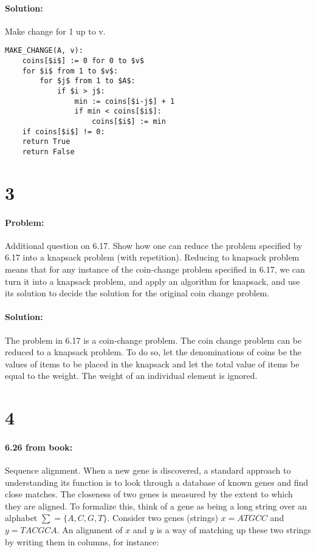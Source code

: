 \documentclass[12pt]{article}
\begin{document}
\paragraph{Solution:}
Make change for 1 up to v.
\begin{lstlisting}[mathescape]
MAKE_CHANGE(A, v):
    coins[$i$] := 0 for 0 to $v$
    for $i$ from 1 to $v$:
        for $j$ from 1 to $A$:
            if $i > j$:
                min := coins[$i-j$] + 1
                if min < coins[$i$]:
                    coins[$i$] := min
    if coins[$i$] != 0:
	return True
    return False
\end{lstlisting}

\section*{3}
\paragraph{Problem:}
Additional question on 6.17. Show how one can reduce the problem specified by
6.17 into a knapsack problem (with repetition). Reducing to knapsack problem
means that for any instance of the coin-change problem specified in 6.17, we
can turn it into a knapsack problem, and apply an algorithm for knapsack, and
use its solution to decide the solution for the original coin change problem.
\paragraph{Solution:}

The problem in 6.17 is a coin-change problem. The coin change problem
can be reduced to a knapsack problem. To do so, let the denominations of
coins be the values of items to be placed in the knapsack and let the
total value of items be equal to the weight. The weight of an individual
element is ignored.

\section*{4}
\paragraph{6.26 from book:}
Sequence alignment. When a new gene is discovered, a standard approach to
understanding its function is to look through a database of known genes and
find close matches. The closeness of two genes is measured by the extent to 
which they are aligned. To formalize this, think of a gene as being a long
string over an alphabet $\sum = \{A, C, G, T\}$. Consider two genes (strings)
$x = AT GCC$ and $y = T ACGCA$. An alignment of $x$ and $y$ is a way of matching up
these two strings by writing them in columns, for instance:
\end{document}

